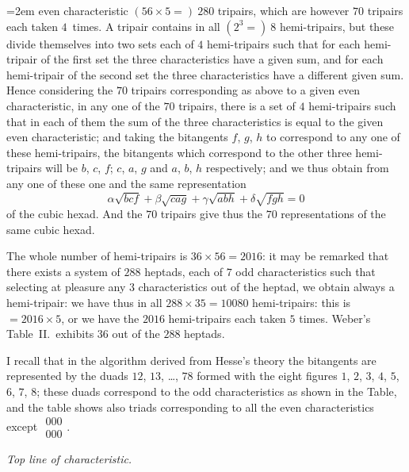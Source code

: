 \documentclass[11pt,a4paper]{book}
\begin{document}
\vspace{1em}

\noindent\hangindent=2em even characteristic $(56 \times 5 =)\ 280$ tripairs, which are however $70$ tripairs each taken $4$~times. A tripair contains in all $(2^3 =)\ 8$ hemi-tripairs, but these divide themselves into two sets each of $4$ hemi-tripairs such that for each hemi-tripair of the first set the three characteristics have a given sum, and for each hemi-tripair of the second set the three characteristics have a different given sum. Hence considering the $70$ tripairs corresponding as above to a given even characteristic, in any one of the $70$ tripairs, there is a set of $4$ hemi-tripairs such that in each of them the sum of the three characteristics is equal to the given even characteristic; and taking the bitangents $f$, $g$, $h$ to correspond to any one of these hemi-tripairs, the bitangents which correspond to the other three hemi-tripairs will be $b$, $c$, $f$; $c$, $a$, $g$ and $a$, $b$, $h$ respectively; and we thus obtain from any one of these one and the same representation
\[
\alpha\sqrt{bcf} + \beta\sqrt{cag} + \gamma\sqrt{abh} + \delta\sqrt{fgh} = 0
\]
of the cubic hexad. And the $70$ tripairs give thus the $70$ representations of the same cubic hexad.

The whole number of hemi-tripairs is $36 \times 56 = 2016$: it may be remarked that there exists a system of $288$ heptads, each of $7$ odd characteristics such that selecting at pleasure any $3$ characteristics out of the heptad, we obtain always a hemi-tripair: we have thus in all $288 \times 35 = 10080$ hemi-tripairs: this is $= 2016 \times 5$, or we have the $2016$ hemi-tripairs each taken $5$ times. Weber's Table~II.\ exhibits $36$ out of the $288$ heptads.

I recall that in the algorithm derived from Hesse's theory the bitangents are represented by the duads $12$, $13$, \dots, $78$ formed with the eight figures $1$, $2$, $3$, $4$, $5$, $6$, $7$, $8$; these duads correspond to the odd characteristics as shown in the Table, and the table shows also triads corresponding to all the even characteristics except $\begin{matrix} 000 \\ 000 \end{matrix}$.

\begin{center}
\small
\textit{Top line of characteristic.}
\end{center}
\end{document}
